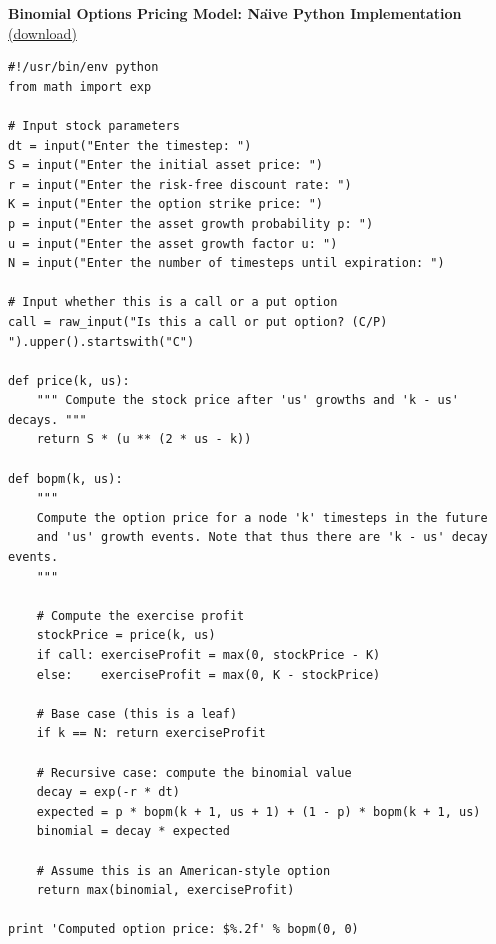 \documentclass[11pt]{article}
\begin{document}
\newpage
\textbf{Binomial Options Pricing Model: Na\"{\i}ve Python Implementation} {\scriptsize \href{http://andrew.gibiansky.com/downloads/code/bopm.py}{(download)}}

\begin{verbatim}
#!/usr/bin/env python
from math import exp

# Input stock parameters
dt = input("Enter the timestep: ")
S = input("Enter the initial asset price: ")
r = input("Enter the risk-free discount rate: ")
K = input("Enter the option strike price: ")
p = input("Enter the asset growth probability p: ")
u = input("Enter the asset growth factor u: ")
N = input("Enter the number of timesteps until expiration: ")

# Input whether this is a call or a put option
call = raw_input("Is this a call or put option? (C/P) ").upper().startswith("C")

def price(k, us):
    """ Compute the stock price after 'us' growths and 'k - us' decays. """
    return S * (u ** (2 * us - k))

def bopm(k, us):
    """
    Compute the option price for a node 'k' timesteps in the future
    and 'us' growth events. Note that thus there are 'k - us' decay events.
    """

    # Compute the exercise profit
    stockPrice = price(k, us)
    if call: exerciseProfit = max(0, stockPrice - K)
    else:    exerciseProfit = max(0, K - stockPrice)

    # Base case (this is a leaf)
    if k == N: return exerciseProfit

    # Recursive case: compute the binomial value 
    decay = exp(-r * dt)
    expected = p * bopm(k + 1, us + 1) + (1 - p) * bopm(k + 1, us)
    binomial = decay * expected

    # Assume this is an American-style option
    return max(binomial, exerciseProfit)

print 'Computed option price: $%.2f' % bopm(0, 0)
\end{verbatim}
\end{document}
